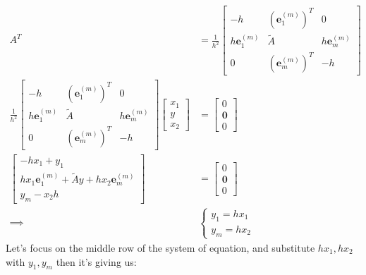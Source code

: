 \documentclass[]{article}
\begin{document}
        \begin{align*}\tag{5.2}\label{eqn:5.2}
            A^T &= 
            \frac{1}{h^2}\begin{bmatrix}
                -h & (\mathbf{e}^{(m)}_1)^T & 0 \\
                h\mathbf{e}_1^{(m)} & \tilde{A} & h\mathbf{e}^{(m)}_m \\ 
                0 & (\mathbf{e}_m^{(m)})^T & - h
            \end{bmatrix} 
            \\
            \frac{1}{h^2}\begin{bmatrix}
                -h & (\mathbf{e}^{(m)}_1)^T & 0 \\
                h\mathbf{e}_1^{(m)} & \tilde{A} & h\mathbf{e}^{(m)}_m \\ 
                0 & (\mathbf{e}_m^{(m)})^T & - h
            \end{bmatrix} 
            \begin{bmatrix}
                x_1 \\ y \\ x_2
            \end{bmatrix}
            & =
            \begin{bmatrix}
                0 \\ \mathbf{0} \\ 0
            \end{bmatrix}
            \\
            \begin{bmatrix}
                -hx_1 + y_1 
                \\
                hx_1 \mathbf{e}_1^{(m)} + \tilde{A}y + hx_2 \mathbf{e}_m^{(m)}
                \\
                y_m -x_2 h
            \end{bmatrix}
            & =
            \begin{bmatrix}
                0 \\ \mathbf{0} \\ 0
            \end{bmatrix}
            \\
            \implies & 
            \begin{cases}
                y_1 = hx_1 \\ 
                y_m = hx_2
            \end{cases}
        \end{align*}
        Let's focus on the middle row of the system of equation, and substitute $hx_1, hx_2$ with $y_1, y_m$ then it's giving us: 
\end{document}
